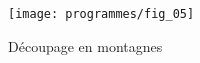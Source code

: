 \ifprof
\else
\begin{figure}[H]
\centering
\texttt{[image: programmes/fig\_05]}
\caption{Découpage en montagnes}
\end{figure}
\fi

%
%
%
%
%
%
%
%
%
%
%
%
%
